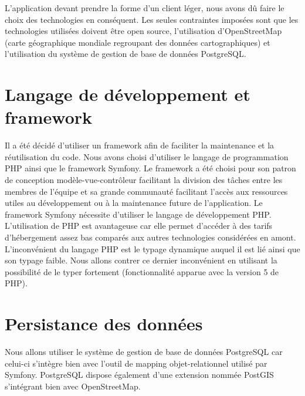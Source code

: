 

L'application devant prendre la forme d'un client léger, nous avons dû faire le choix des technologies en conséquent. Les seules contraintes imposées sont que les technologies utilisées doivent être open source, l'utilisation d'OpenStreetMap (carte géographique mondiale regroupant des données cartographiques) et l'utilisation du système de gestion de base de données PostgreSQL.

\section{Langage de développement et framework}
Il a été décidé d'utiliser un framework afin de faciliter la maintenance et la réutilisation du code.
Nous avons choisi d'utiliser le langage de programmation PHP ainsi que le framework Symfony. Le framework a été choisi pour son patron de conception modèle-vue-contrôleur facilitant la division des tâches entre les membres de l'équipe et sa grande communauté facilitant l'accès aux ressources utiles au développement ou à la maintenance future de l'application.
Le framework Symfony nécessite d'utiliser le langage de développement PHP. L'utilisation de PHP est avantageuse car elle permet d'accéder à des tarifs d'hébergement assez bas comparés aux autres technologies considérées en amont.
L'inconvénient du langage PHP est le typage dynamique auquel il est lié ainsi que son typage faible. 
Nous allons contrer ce dernier inconvénient en utilisant la possibilité de le typer fortement (fonctionnalité apparue avec la version 5 de PHP).

\section{Persistance des données}
Nous allons utiliser le système de gestion de base de données PostgreSQL car celui-ci s'intègre bien avec l'outil de mapping objet-relationnel utilisé par Symfony. PostgreSQL dispose également d'une extension nommée PostGIS s'intégrant bien avec OpenStreetMap.